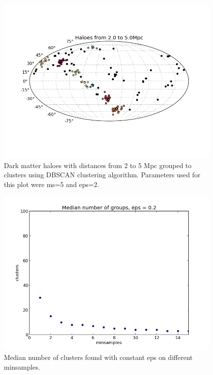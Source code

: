 \documentclass[english, oneside]{HYgradu}
\begin{document}
\begin{figure}
   \centering
   \includegraphics[width=\textwidth]{kuvat/clustering-ms5eps2.png}
   \caption{Dark matter haloes with distances from 2 to 5 Mpc grouped to clusters using DBSCAN clustering algorithm. Parameters used for this plot were ms=5 and eps=2.}\label{fig:clustering}
\end{figure}

\begin{figure}
   \centering
   \includegraphics[width=\textwidth]{kuvat/eps-02.png}
   \caption{Median number of clusters found with constant eps on different minsamples.}\label{fig:epseffect}
\end{figure}
\end{document}

